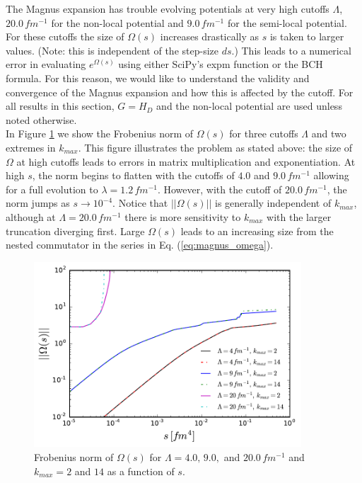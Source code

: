 \documentclass[preprintnumbers,floatfix,aps,prc,preprint]{revtex4-1}
\begin{document}
The Magnus expansion has trouble evolving potentials at very high cutoffs $\Lambda$, $20.0 \, fm^{-1}$ for the non-local potential and $9.0 \, fm^{-1}$ for the semi-local potential. For these cutoffs the size of $\Omega(s)$ increases drastically as $s$ is taken to larger values. (Note: this is independent of the step-size $ds$.) This leads to a numerical error in evaluating $e^{\Omega(s)}$ using either SciPy's expm function or the BCH formula. For this reason, we would like to understand the validity and convergence of the Magnus expansion and how this is affected by the cutoff. For all results in this section, $G=H_D$ and the non-local potential are used unless noted otherwise. \\

In Figure \ref{fig:omega_norms_Wendt_Wegner} we show the Frobenius norm of $\Omega(s)$ for three cutoffs $\Lambda$ and two extremes in $k_{max}$. This figure illustrates the problem as stated above: the size of $\Omega$ at high cutoffs leads to errors in matrix multiplication and exponentiation. At high $s$, the norm begins to flatten with the cutoffs of $4.0$ and $9.0 \, fm^{-1}$ allowing for a full evolution to $\lambda = 1.2 \, fm^{-1}$. However, with the cutoff of $20.0 \, fm^{-1}$, the norm jumps as $s \rightarrow 10^{-4}$. Notice that $||\Omega(s)||$ is generally independent of $k_{max}$, although at $\Lambda=20.0 \, fm^{-1}$ there is more sensitivity to $k_{max}$ with the larger truncation diverging first. Large $\Omega(s)$ leads to an increasing size from the nested commutator in the series in Eq. (\ref{eq:magnus_omega}).
%
\begin{figure}[H]
  \centering
  \includegraphics[width=10cm]{omega_norms_Wendt_Wegner}
   \hspace*{0.05\textwidth}%
  \caption{Frobenius norm of $\Omega(s)$ for $\Lambda = 4.0, \, 9.0,$ and $20.0 \, fm^{-1}$ and $k_{max}=2$ and $14$ as a function of $s$.}
  \label{fig:omega_norms_Wendt_Wegner}
\end{figure}
\end{document}
